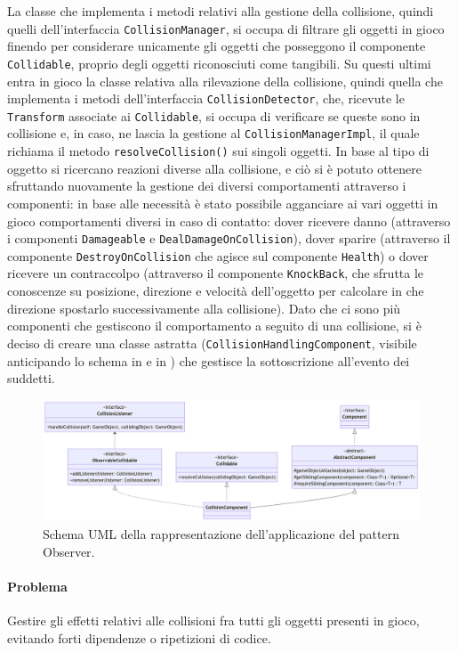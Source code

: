 \documentclass[a4paper,12pt]{report}
\begin{document}
La classe che implementa i metodi relativi alla gestione della collisione, quindi quelli dell'interfaccia \texttt{CollisionManager}, si occupa di filtrare gli oggetti in gioco finendo per considerare unicamente gli oggetti che posseggono il componente \texttt{Collidable}, proprio degli oggetti riconosciuti come tangibili.
Su questi ultimi entra in gioco la classe relativa alla rilevazione della collisione, quindi quella che implementa i metodi dell'interfaccia \texttt{CollisionDetector}, che, ricevute le \texttt{Transform} associate ai \texttt{Collidable}, si occupa di verificare se queste sono in collisione e, in caso, ne lascia la gestione al \texttt{CollisionManagerImpl}, il quale richiama il metodo \texttt{resolveCollision()} sui singoli oggetti.
In base al tipo di oggetto si ricercano reazioni diverse alla collisione, e ciò si è potuto ottenere sfruttando nuovamente la gestione dei diversi comportamenti attraverso i componenti: in base alle necessità è stato possibile agganciare ai vari oggetti in gioco comportamenti diversi in caso di contatto: dover ricevere danno (attraverso i componenti \texttt{Damageable} e \texttt{DealDamageOnCollision}), dover sparire (attraverso il componente \texttt{DestroyOnCollision} che agisce sul componente \texttt{Health}) o dover ricevere un contraccolpo (attraverso il componente \texttt{KnockBack}, che sfrutta le conoscenze su posizione, direzione e velocità dell'oggetto per calcolare in che direzione spostarlo successivamente alla collisione).
Dato che ci sono più componenti che gestiscono il comportamento a seguito di una collisione, si è deciso di creare una classe astratta (\texttt{CollisionHandlingComponent}, visibile anticipando lo schema in  e in ) che gestisce la sottoscrizione all'evento dei suddetti.
%
\begin{figure}[H]
    \centering{}
    \includegraphics[width=\textwidth]{img/CollisionComponent.png}
    \caption{Schema UML della rappresentazione dell'applicazione del pattern Observer.}
\end{figure}
%
\paragraph*{Problema}
Gestire gli effetti relativi alle collisioni fra tutti gli oggetti presenti in gioco, evitando forti dipendenze o ripetizioni di codice.
\end{document}
